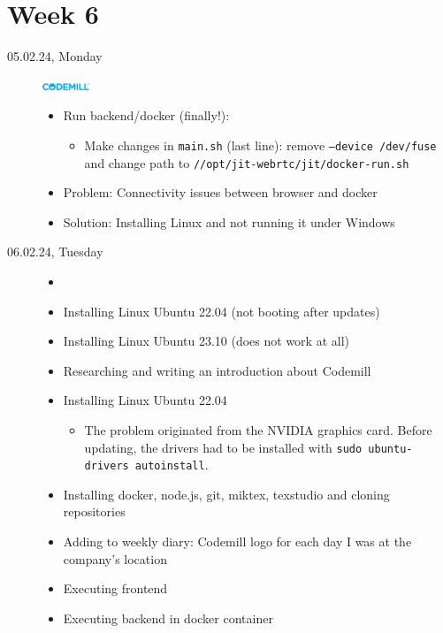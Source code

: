 \documentclass[a4, 11pt]{scrartcl}
\begin{document}
\newpage
\section*{Week 6}

\begin{description}

\item[05.02.24, Monday]
\includegraphics[width=1.4cm]{codemill.png}
\begin{itemize}
	\item Run backend/docker (finally!): 
	\begin{itemize}
		\item Make changes in \texttt{main.sh} (last line): remove \texttt{--device /dev/fuse} and change path to  \texttt{//opt/jit-webrtc/jit/docker-run.sh}
	\end{itemize}
	\item Problem: Connectivity issues between browser and docker
	\item Solution: Installing Linux and not running it under Windows
\end{itemize}









\item[06.02.24, Tuesday]
\begin{itemize}
	\item[]
	\item Installing Linux Ubuntu 22.04 (not booting after updates)
	\item Installing Linux Ubuntu 23.10 (does not work at all)
	\item Researching and writing an introduction about Codemill
	\item Installing Linux Ubuntu 22.04
	\begin{itemize}
		\item The problem originated from the NVIDIA graphics card. Before updating, the drivers had to be installed with \texttt{sudo ubuntu-drivers autoinstall}.
	\end{itemize}
	\item Installing docker, node.js, git, miktex, texstudio and cloning repositories
	\item Adding to weekly diary: Codemill logo for each day I was at the company's location
	\item Executing frontend
	\item Executing backend in docker container
\end{itemize}










\end{description}
\end{document}

